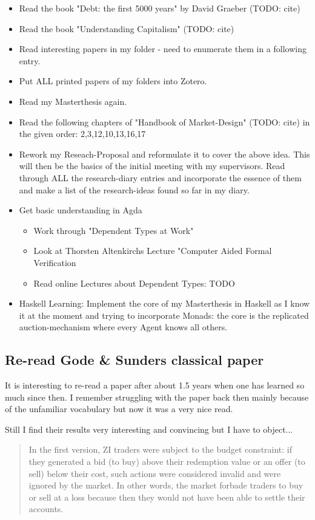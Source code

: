 \begin{itemize}
\item Read the book "Debt: the first 5000 years" by David Graeber (TODO: cite)
\item Read the book "Understanding Capitalism" (TODO: cite)
\item Read interesting papers in my folder - need to enumerate them in a following entry.
\item Put ALL printed papers of my folders into Zotero. 
\item Read my Masterthesis again.
\item Read the following chapters of "Handbook of Market-Design" (TODO: cite) in the given order: 2,3,12,10,13,16,17
\item Rework my Reseach-Proposal and reformulate it to cover the above idea. 
This will then be the basics of the initial meeting with my supervisors. Read through ALL the research-diary entries and incorporate the essence of them and make a list of the research-ideas found so far in my diary.
\item Get basic understanding in Agda 
	\begin{itemize}
	\item Work through "Dependent Types at Work"
	\item Look at Thorsten Altenkirchs Lecture "Computer Aided Formal Verification
	\item Read online Lectures about Dependent Types: TODO
	\end{itemize}
\item Haskell Learning: Implement the core of my Masterthesis in Haskell as I know it at the moment and trying to incorporate Monads: the core is the replicated auction-mechanism where every Agent knows all others.
\end{itemize}

\subsection*{Re-read Gode \& Sunders classical paper}
It is interesting to re-read a paper after about 1.5 years when one has learned so much since then. I remember struggling with the paper back then mainly because of the unfamiliar vocabulary but now it was a very nice read. 

\bigskip

Still I find their results very interesting and convincing but I have to object...

\begin{quote}
In the first version, ZI traders were subject to the budget constraint: if they generated a bid (to buy) above their redemption value or an offer (to sell) below their cost, such actions were considered invalid and were ignored by the market. In other words, the market forbade traders to buy or sell at a loss because then they would not have been able to settle their accounts.
\end{quote}

